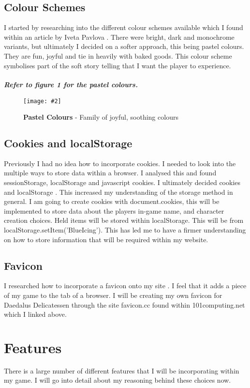 \documentclass[10pt, a4paper]{article}
\newcommand{\figuremacro}[5]{
    \begin{figure}[#1]
        \centering
        \texttt{[image: \#2]}
        \caption[#3]{\textbf{#3}#4}
        \label{fig:#2}
    \end{figure}
}
\begin{document}
	\subsection{Colour Schemes}
	I started by researching into the different colour schemes available which I found within an article by Iveta Pavlova \cite{ColourSchemes}. There were bright, dark and monochrome variants, but ultimately I decided on a softer approach, this being pastel colours. They are fun, joyful and tie in heavily with baked goods. This colour scheme symbolises part of the soft story telling that I want the player to experience. \\
	\\
    \textbf{\textit{Refer to figure 1 for the pastel colours.}} \\

	\figuremacro{h}{pastel}{Pastel Colours}{ - Family of joyful, soothing colours \cite{PastelColours}}{1.0}
  
	\subsection{Cookies and localStorage}
	Previously I had no idea how to incorporate cookies. I needed to look into the multiple ways to store data within a browser. I analysed this and found sessionStorage, localStorage and javascript cookies. I ultimately decided cookies \cite{JavascriptCookies} and localStorage \cite{LocalStorage}. This increased my understanding of the storage method in general. I am going to create cookies with document.cookies, this will be implemented to store data about the players in-game name, and character creation choices. Held items will be stored within localStorage. This will be from localStorage.setItem('BlueIcing'). This has led me to have a firmer understanding on how to store information that will be required within my website.
	
	\subsection{Favicon}
	I researched how to incorporate a favicon onto my site \cite{Favicon}. I feel that it adds a piece of my game to the tab of a browser. I will be creating my own favicon for Daedalus Delicatessen through the site favicon.cc found within 101computing.net which I linked above.

    \section{Features}
    There is a large number of different features that I will be incorporating within my game. I will go into detail about my reasoning behind these choices now. 
    
\end{document}
